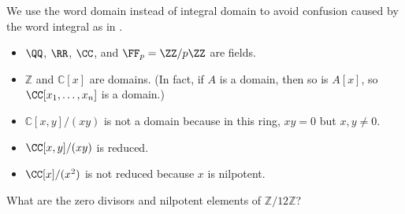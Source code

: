 \begin{remark}
    We use the word domain 
    instead of integral domain to avoid confusion caused
    by the word integral as in .
\end{remark}
\begin{example}
    \begin{itemize}
    \item $\QQ$, $\RR$, $\CC$, and $\FF_p = \ZZ/p\ZZ$ are fields.
    \item $\mathbb Z$ and $\mathbb C[x]$ are domains.
    (In fact, if $A$ is a domain, then so is $A[x]$,
    so $\CC[x_1,\dots,x_n]$ is a domain.)
    \item $\mathbb C[x,y] / (xy)$ is not a domain
    because in this ring, $xy=0$ but $x,y\neq 0$.
    \item $\CC[x,y]/(xy)$ is reduced.
    \item $\CC[x]/(x^2)$ is not reduced because $x$ is nilpotent.
    \end{itemize}
\end{example}
\begin{exercise}
    What are the zero divisors and nilpotent elements
    of $\mathbb Z/12\mathbb Z$?
\end{exercise}
